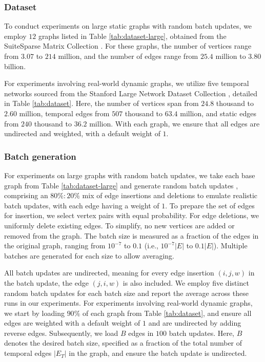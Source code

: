 \subsubsection{Dataset}
\label{sec:dataset}

To conduct experiments on large static graphs with random batch updates, we employ $12$ graphs listed in Table \ref{tab:dataset-large}, obtained from the SuiteSparse Matrix Collection \cite{suite19}. For these graphs, the number of vertices range from $3.07$ to $214$ million, and the number of edges range from $25.4$ million to $3.80$ billion. For experiments involving real-world dynamic graphs, we utilize five temporal networks sourced from the Stanford Large Network Dataset Collection \cite{snapnets}, detailed in Table \ref{tab:dataset}. Here, the number of vertices span from $24.8$ thousand to $2.60$ million, temporal edges from $507$ thousand to $63.4$ million, and static edges from $240$ thousand to $36.2$ million. With each graph, we ensure that all edges are undirected and weighted, with a default weight of $1$.





\subsubsection{Batch generation}
\label{sec:batch-generation}

For experiments on large graphs with random batch updates, we take each base graph from Table \ref{tab:dataset-large} and generate random batch updates \cite{com-zarayeneh21}, comprising an $80\% : 20\%$ mix of edge insertions and deletions to emulate realistic batch updates, with each edge having a weight of $1$. To prepare the set of edges for insertion, we select vertex pairs with equal probability. For edge deletions, we uniformly delete existing edges. To simplify, no new vertices are added or removed from the graph. The batch size is measured as a fraction of the edges in the original graph, ranging from $10^{-7}$ to $0.1$ (i.e., $10^{-7}|E|$ to $0.1|E|$). Multiple batches are generated for each size to allow averaging. All batch updates are undirected, meaning for every edge insertion $(i, j, w)$ in the batch update, the edge $(j, i, w)$ is also included. We employ five distinct random batch updates for each batch size and report the average across these runs in our experiments. For experiments involving real-world dynamic graphs, we start by loading $90\%$ of each graph from Table \ref{tab:dataset}, and ensure all edges are weighted with a default weight of $1$ and are undirected by adding reverse edges. Subsequently, we load $B$ edges in $100$ batch updates. Here, $B$ denotes the desired batch size, specified as a fraction of the total number of temporal edges $|E_T|$ in the graph, and ensure the batch update is undirected.


